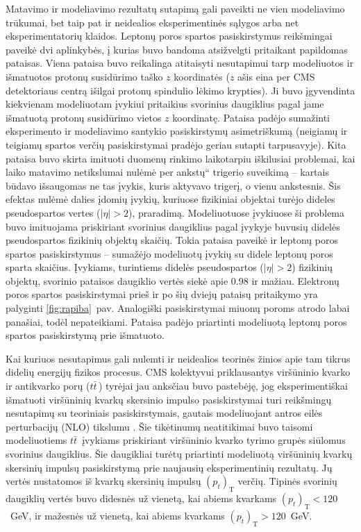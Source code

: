 \documentclass[a4paper, 12pt, oneside]{article}
\newcommand{\ttbar}{t\bar{t}}
\newcommand{\ltq}[1]{{\quotedblbase{}#1\textquotedblleft{}}}
\newlength\q
\begin{document}
Matavimo ir modeliavimo rezultatų sutapimą gali paveikti ne vien modeliavimo trūkumai, bet taip pat ir neidealios
eksperimentinės sąlygos arba net eksperimentatorių klaidos.
Leptonų poros spartos pasiskirstymus reikšmingai paveikė dvi aplinkybės, į kurias buvo bandoma atsižvelgti pritaikant
papildomas pataisas.
Viena pataisa buvo reikalinga atitaisyti nesutapimui tarp modeliuotos ir išmatuotos protonų susidūrimo taško $z$
koordinatės ($z$ ašis eina per CMS detektoriaus centrą išilgai protonų spindulio lėkimo krypties).
Ji buvo įgyvendinta kiekvienam modeliuotam įvykiui pritaikius svorinius daugiklius pagal jame išmatuotą protonų susidūrimo
vietos $z$ koordinatę.
Pataisa padėjo sumažinti eksperimento ir modeliavimo santykio pasiskirstymų asimetriškumą (neigiamų ir teigiamų spartos verčių
pasiskirstymai pradėjo geriau sutapti tarpusavyje).
Kita pataisa buvo skirta imituoti duomenų rinkimo laikotarpiu iškilusiai problemai, kai laiko matavimo netikslumai nulėmė
\ltq{per ankstų} trigerio suveikimą -- kartais būdavo išsaugomas ne tas įvykis, kuris aktyvavo trigerį, o vienu ankstesnis.
Šis efektas nulėmė dalies įdomių įvykių, kuriuose fizikiniai objektai turėjo dideles pseudospartos vertes ($|\eta|>2$), praradimą.
Modeliuotuose įvykiuose ši problema buvo imituojama priskiriant svorinius daugiklius pagal įvykyje buvusių didelės pseudospartos
fizikinių objektų skaičių.
Tokia pataisa paveikė ir leptonų poros spartos pasiskirstymus -- sumažėjo modeliuotų įvykių su didele leptonų poros sparta skaičius.
Įvykiams, turintiems didelės pseudospartos ($|\eta|>2$) fizikinių objektų, svorinio pataisos daugiklio vertės siekė apie $0.98$ ir mažiau.
Elektronų poros spartos pasiskirstymai prieš ir po šių dviejų pataisų pritaikymo yra palyginti \ref{fig:rapiba}~pav.
Analogiški pasiskirstymai miuonų poroms atrodo labai panašiai, todėl nepateikiami.
Pataisa padėjo priartinti modeliuotą leptonų poros spartos pasiskirstymą prie išmatuoto.

Kai kuriuos nesutapimus gali nulemti ir neidealios teorinės žinios apie tam tikrus didelių energijų fizikos procesus.
CMS kolektyvui priklausantys viršūninio kvarko ir antikvarko porų ($\ttbar\,$) tyrėjai jau anksčiau buvo pastebėję, jog
eksperimentiškai išmatuoti viršūninių kvarkų skersinio impulso pasiskirstymai turi reikšmingų nesutapimų su teoriniais
pasiskirstymais, gautais modeliuojant antros eilės perturbacijų (NLO) tikslumu \cite{ttbarPT}.
Šie tikėtinumų neatitikimai buvo taisomi modeliuotiems $\ttbar\,$ įvykiams priskiriant viršūninio kvarko tyrimo grupės
siūlomus svorinius daugiklius.
Šie daugikliai turėtų priartinti modeliuotą viršūninių kvarkų skersinių impulsų pasiskirstymą prie naujausių eksperimentinių rezultatų.
Jų vertės nustatomos iš kvarkų skersinių impulsų $(p_{t})_{\mathrm{T}}$ verčių.
Tipinės svorinių daugiklių vertės buvo didesnės už vienetą, kai abiems kvarkams $(p_{t})_{\mathrm{T}}<120$~GeV, ir mažesnės už vienetą,
kai abiems kvarkams $(p_{t})_{\mathrm{T}}>120$~GeV.
\end{document}
